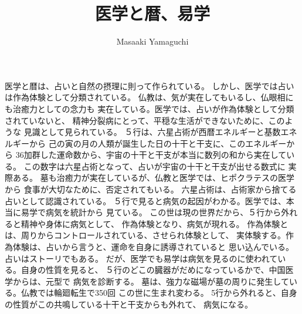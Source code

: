 \documentclass{jsarticle}
\begin{document}
\title{医学と暦、易学}
\author{Masaaki Yamaguchi}
\date{}
\maketitle

      医学と暦は、占いと自然の摂理に則って作られている。
   しかし、医学では占いは作為体験として分類されている。
   仏教は、気が実在してもいるし、仏眼相にも治癒力としての念力も
   実在している。医学では、占いが作為体験として分類されていないと、
   精神分裂病にとって、平穏な生活ができないために、このような
   見識として見られている。
   ５行は、六星占術が西暦エネルギーと基数エネルギーから
   己の寅の月の人類が誕生した日の十干と干支に、このエネルギーから
   36加群した運命数から、宇宙の十干と干支が本当に数列の和から実在している。
   この数字は六星占術となって、占いが宇宙の十干と干支が出せる数式に
   実際ある。
   墓も治癒力が実在しているが、仏教と医学では、ヒポクラテスの医学から
   食事が大切なために、否定されてもいる。
   六星占術は、占術家から捨てる占いとして認識されている。
   ５行で見ると病気の起因がわかる。医学では、本当に易学で病気を統計から
   見ている。 
   この世は現の世界だから、５行から外れると精神や身体に病気として、
   作為体験となり、病気が現れる。
   作為体験とは、周りからコントロールされている、させられ体験として、
   実体験する。作為体験は、占いから言うと、運命を自身に誘導されていると
   思い込んでいる。占いはストーリでもある。
   だが、医学でも易学は病気を見るのに使われている。自身の性質を見ると、
   ５行のどこの臓器がだめになっているかで、中国医学からは、元型で
   病気を診断する。
    墓は、強力な磁場が墓の周りに発生している。仏教では輪廻転生で350回
    この世に生まれ変わる。
    5行から外れると、自身の性質がこの共鳴している十干と干支からも外れて、
    病気になる。
\end{document}
